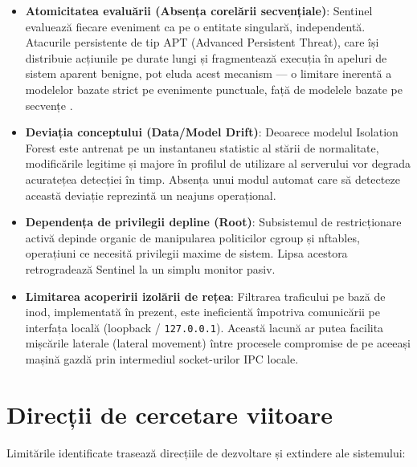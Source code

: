 \begin{itemize}
    \item \textbf{Atomicitatea evaluării (Absența corelării secvențiale)}: Sentinel evaluează fiecare eveniment ca pe o entitate singulară, independentă. Atacurile persistente de tip APT (Advanced Persistent Threat), care își distribuie acțiunile pe durate lungi și fragmentează execuția în apeluri de sistem aparent benigne, pot eluda acest mecanism --- o limitare inerentă a modelelor bazate strict pe evenimente punctuale, față de modelele bazate pe secvențe \cite{Denning1987}.
    \item \textbf{Deviația conceptului (Data/Model Drift)}: Deoarece modelul Isolation Forest este antrenat pe un instantaneu statistic al stării de normalitate, modificările legitime și majore în profilul de utilizare al serverului vor degrada acuratețea detecției în timp. Absența unui modul automat care să detecteze această deviație reprezintă un neajuns operațional.
    \item \textbf{Dependența de privilegii depline (Root)}: Subsistemul de restricționare activă depinde organic de manipularea politicilor cgroup și nftables, operațiuni ce necesită privilegii maxime de sistem. Lipsa acestora retrogradează Sentinel la un simplu monitor pasiv.
    \item \textbf{Limitarea acoperirii izolării de rețea}: Filtrarea traficului pe bază de inod, implementată în prezent, este ineficientă împotriva comunicării pe interfața locală (loopback / \texttt{127.0.0.1}). Această lacună ar putea facilita mișcările laterale (lateral movement) între procesele compromise de pe aceeași mașină gazdă prin intermediul socket-urilor IPC locale.
\end{itemize}


\section*{Direcții de cercetare viitoare}

\par Limitările identificate trasează direcțiile de dezvoltare și extindere ale sistemului:

